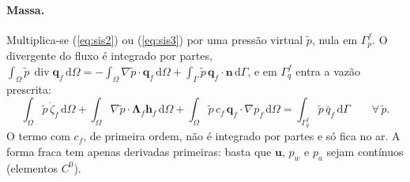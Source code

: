 \documentclass[11pt,a4paper]{article}
\newcommand{\vu}{\bm u}
\newcommand{\vq}{\bm q}
\newcommand{\dv}{\operatorname{div}}
\newcommand{\dd}{\mathrm d}
\begin{document}
\paragraph{Massa.} Multiplica-se (\ref{eq:sis2}) ou (\ref{eq:sis3}) por uma pressão virtual
$\tilde p$, nula em $\Gamma_p^f$. O divergente do fluxo é integrado por partes,
$\int_\Omega\tilde p\,\dv\vq_f\,\dd\Omega=-\int_\Omega\nabla\tilde p\cdot\vq_f\,\dd\Omega
+\int_\Gamma\tilde p\,\vq_f\cdot\bm n\,\dd\Gamma$, e em $\Gamma_q^f$ entra a vazão prescrita:
\begin{equation}
\int_\Omega\tilde p\,\dot\zeta_f\,\dd\Omega
+\int_\Omega\nabla\tilde p\cdot\bm\Lambda_f\bm h_f\,\dd\Omega
+\int_\Omega\tilde p\,c_f\,\vq_f\cdot\nabla p_f\,\dd\Omega
=\int_{\Gamma_q^f}\tilde p\,\bar q_f\,\dd\Gamma
\qquad\forall\,\tilde p .
\label{eq:fraca_p}
\end{equation}
O termo com $c_f$, de primeira ordem, não é integrado por partes e só fica no ar. A forma
fraca tem apenas derivadas primeiras: basta que $\vu$, $p_w$ e $p_a$ sejam contínuos
(elementos $C^0$).
\end{document}
